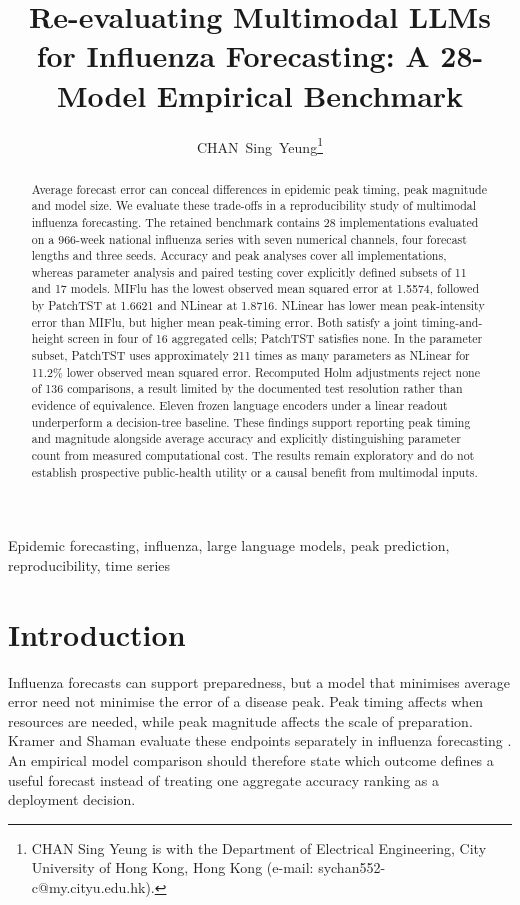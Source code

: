 \documentclass[journal,twoside,print]{ieeecolor}
\begin{document}
\title{Re-evaluating Multimodal LLMs for Influenza Forecasting: A 28-Model Empirical Benchmark}
\author{\mbox{CHAN~Sing~Yeung}\thanks{CHAN Sing Yeung is with the Department of Electrical Engineering, City University of Hong Kong, Hong Kong (e-mail: sychan552-c@my.cityu.edu.hk).}}
\maketitle
\begin{abstract}
Average forecast error can conceal differences in epidemic peak timing, peak magnitude and model size. We evaluate these trade-offs in a reproducibility study of multimodal influenza forecasting. The retained benchmark contains 28 implementations evaluated on a 966-week national influenza series with seven numerical channels, four forecast lengths and three seeds. Accuracy and peak analyses cover all implementations, whereas parameter analysis and paired testing cover explicitly defined subsets of 11 and 17 models. MIFlu has the lowest observed mean squared error at 1.5574, followed by PatchTST at 1.6621 and NLinear at 1.8716. NLinear has lower mean peak-intensity error than MIFlu, but higher mean peak-timing error. Both satisfy a joint timing-and-height screen in four of 16 aggregated cells; PatchTST satisfies none. In the parameter subset, PatchTST uses approximately 211 times as many parameters as NLinear for 11.2\% lower observed mean squared error. Recomputed Holm adjustments reject none of 136 comparisons, a result limited by the documented test resolution rather than evidence of equivalence. Eleven frozen language encoders under a linear readout underperform a decision-tree baseline. These findings support reporting peak timing and magnitude alongside average accuracy and explicitly distinguishing parameter count from measured computational cost. The results remain exploratory and do not establish prospective public-health utility or a causal benefit from multimodal inputs.
\end{abstract}
\begin{IEEEkeywords}
Epidemic forecasting, influenza, large language models, peak prediction, reproducibility, time series
\end{IEEEkeywords}
\section{Introduction}
Influenza forecasts can support preparedness, but a model that minimises average error need not minimise the error of a disease peak. Peak timing affects when resources are needed, while peak magnitude affects the scale of preparation. Kramer and Shaman evaluate these endpoints separately in influenza forecasting \cite{r2}. An empirical model comparison should therefore state which outcome defines a useful forecast instead of treating one aggregate accuracy ranking as a deployment decision.
\end{document}
